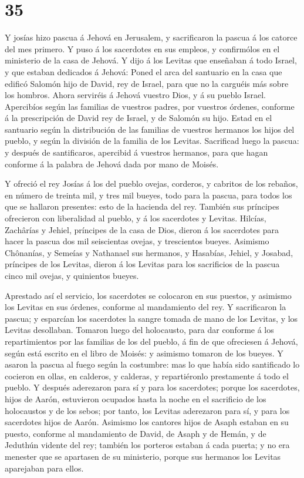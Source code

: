 \hypertarget{section-34}{%
\section{35}\label{section-34}}

 Y josías hizo pascua á Jehová en Jerusalem, y sacrificaron
la pascua á los catorce del mes primero.  Y puso á los
sacerdotes en sus empleos, y confirmólos en el ministerio de la casa de
Jehová.  Y dijo á los Levitas que enseñaban á todo Israel, y
que estaban dedicados á Jehová: Poned el arca del santuario en la casa
que edificó Salomón hijo de David, rey de Israel, para que no la
carguéis más sobre los hombros. Ahora serviréis á Jehová vuestro Dios, y
á su pueblo Israel.  Apercibíos según las familias de
vuestros padres, por vuestros órdenes, conforme á la prescripción de
David rey de Israel, y de Salomón su hijo.  Estad en el
santuario según la distribución de las familias de vuestros hermanos los
hijos del pueblo, y según la división de la familia de los Levitas.
 Sacrificad luego la pascua: y después de santificaros,
apercibid á vuestros hermanos, para que hagan conforme á la palabra de
Jehová dada por mano de Moisés.

 Y ofreció el rey Josías á los del pueblo ovejas, corderos,
y cabritos de los rebaños, en número de treinta mil, y tres mil bueyes,
todo para la pascua, para todos los que se hallaron presentes: esto de
la hacienda del rey.  También sus príncipes ofrecieron con
liberalidad al pueblo, y á los sacerdotes y Levitas. Hilcías, Zachârías
y Jehiel, príncipes de la casa de Dios, dieron á los sacerdotes para
hacer la pascua dos mil seiscientas ovejas, y trescientos bueyes.
 Asimismo Chônanías, y Semeías y Nathanael sus hermanos, y
Hasabías, Jehiel, y Josabad, príncipes de los Levitas, dieron á los
Levitas para los sacrificios de la pascua cinco mil ovejas, y quinientos
bueyes.

 Aprestado así el servicio, los sacerdotes se colocaron en
sus puestos, y asimismo los Levitas en sus órdenes, conforme al
mandamiento del rey.  Y sacrificaron la pascua; y esparcían
los sacerdotes la sangre tomada de mano de los Levitas, y los Levitas
desollaban.  Tomaron luego del holocausto, para dar
conforme á los repartimientos por las familias de los del pueblo, á fin
de que ofreciesen á Jehová, según está escrito en el libro de Moisés: y
asimismo tomaron de los bueyes.  Y asaron la pascua al
fuego según la costumbre: mas lo que había sido santificado lo cocieron
en ollas, en calderos, y calderas, y repartiéronlo prestamente á todo el
pueblo.  Y después aderezaron para sí y para los
sacerdotes; porque los sacerdotes, hijos de Aarón, estuvieron ocupados
hasta la noche en el sacrificio de los holocaustos y de los sebos; por
tanto, los Levitas aderezaron para sí, y para los sacerdotes hijos de
Aarón.  Asimismo los cantores hijos de Asaph estaban en su
puesto, conforme al mandamiento de David, de Asaph y de Hemán, y de
Jeduthún vidente del rey; también los porteros estaban á cada puerta; y
no era menester que se apartasen de su ministerio, porque sus hermanos
los Levitas aparejaban para ellos.

